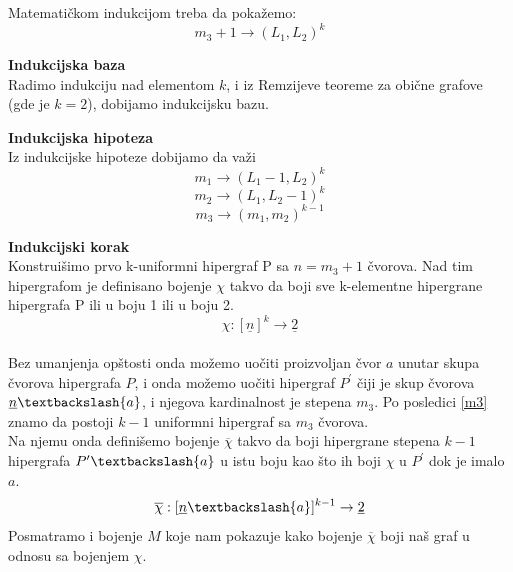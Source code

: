 \documentclass[a4paper]{article}
\begin{document}
	\noindent  
	Matematičkom indukcijom treba da pokažemo:
	\begin{equation}\label{OsnovnaRemzijeva}
		m_{3} + 1 \rightarrow (L_1, L_2)^k		
	\end{equation}
	\begin{description}
		\item \textbf{Indukcijska baza} \\
		Radimo indukciju nad elementom $k$, i iz Remzijeve teoreme za obične grafove (gde je $k = 2$), dobijamo indukcijsku bazu. 
		\item \textbf{Indukcijska hipoteza}\\
		Iz indukcijske hipoteze dobijamo da važi
		\begin{equation}\label{m1}
		m_{1} \rightarrow (L_1 - 1, L_2)^k		
		\end{equation}
		\begin{equation}\label{m2}
		m_{2} \rightarrow (L_1, L_2 -1)^k		
		\end{equation}
		\begin{equation}\label{m3}
		m_{3} \rightarrow (m_1, m_2)^{k-1}		
		\end{equation}
		\item \textbf{Indukcijski korak}\\	
		Konstruišimo prvo k-uniformni hipergraf P sa $n = m_3 + 1$ čvorova. Nad tim hipergrafom je definisano bojenje $\chi$ takvo da boji sve k-elementne hipergrane hipergrafa P ili u boju 1 ili u boju 2.\begin{equation}
			\chi : [ \underline{n} ]^k  \rightarrow \underline{2}
		\end{equation} \\
		Bez umanjenja opštosti onda možemo uočiti proizvoljan čvor $a$ unutar skupa čvorova hipergrafa $P$, i onda možemo uočiti hipergraf $P^\prime$ čiji je skup čvorova $\underline{n} \textbackslash \{ a \}$, i njegova kardinalnost je stepena $m_3$. Po posledici \ref{m3} znamo da postoji $k-1$ uniformni hipergraf sa $m_3$ čvorova. %
		\\
		Na njemu onda definišemo bojenje $\overline{\chi}$ takvo da boji hipergrane stepena $k-1$ hipergrafa $P^\prime \textbackslash \{ a \}$ u istu boju kao što ih boji  $\chi$ u $P^\prime$ dok je imalo $a$.
		\begin{equation}
			\overline{\chi} : [ \underline{n} \textbackslash \{a\} ]^{k-1}  \rightarrow \underline{2}
		\end{equation} %
		Posmatramo i bojenje $M$ koje nam pokazuje kako bojenje $\overline{\chi}$ boji naš graf u odnosu sa bojenjem $\chi$.

\end{description}
\end{document}
